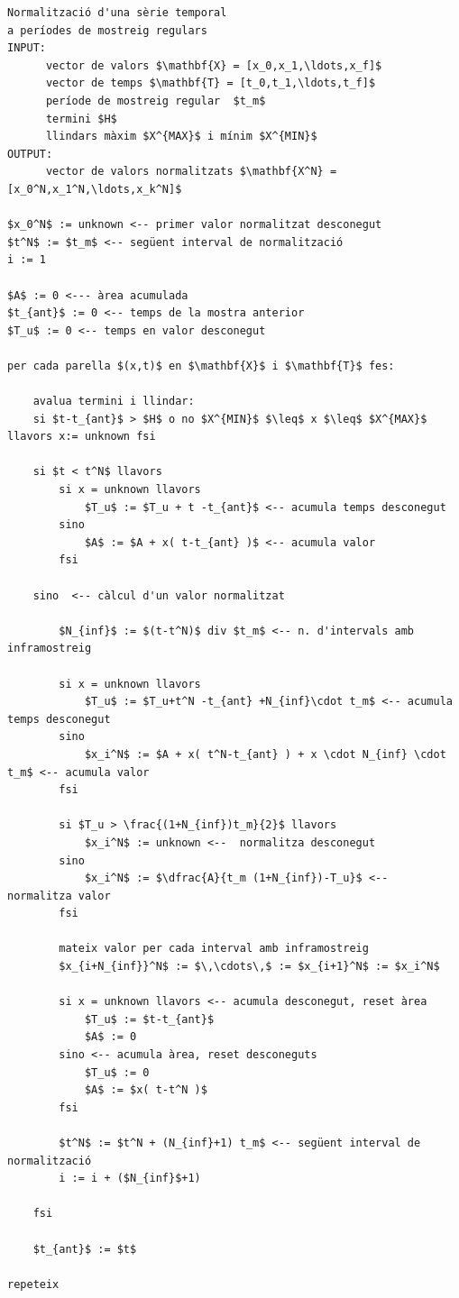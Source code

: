 \begin{lstlisting}[mathescape=true]
Normalització d'una sèrie temporal
a períodes de mostreig regulars 
INPUT: 
      vector de valors $\mathbf{X} = [x_0,x_1,\ldots,x_f]$ 
      vector de temps $\mathbf{T} = [t_0,t_1,\ldots,t_f]$
      període de mostreig regular  $t_m$
      termini $H$
      llindars màxim $X^{MAX}$ i mínim $X^{MIN}$
OUTPUT: 
      vector de valors normalitzats $\mathbf{X^N} = [x_0^N,x_1^N,\ldots,x_k^N]$

$x_0^N$ := unknown <-- primer valor normalitzat desconegut
$t^N$ := $t_m$ <-- següent interval de normalització
i := 1

$A$ := 0 <--- àrea acumulada
$t_{ant}$ := 0 <-- temps de la mostra anterior
$T_u$ := 0 <-- temps en valor desconegut

per cada parella $(x,t)$ en $\mathbf{X}$ i $\mathbf{T}$ fes:

    avalua termini i llindar:
    si $t-t_{ant}$ > $H$ o no $X^{MIN}$ $\leq$ x $\leq$ $X^{MAX}$ llavors x:= unknown fsi

    si $t < t^N$ llavors
        si x = unknown llavors
            $T_u$ := $T_u + t -t_{ant}$ <-- acumula temps desconegut
        sino
            $A$ := $A + x( t-t_{ant} )$ <-- acumula valor
        fsi

    sino  <-- càlcul d'un valor normalitzat

        $N_{inf}$ := $(t-t^N)$ div $t_m$ <-- n. d'intervals amb inframostreig

        si x = unknown llavors
            $T_u$ := $T_u+t^N -t_{ant} +N_{inf}\cdot t_m$ <-- acumula temps desconegut
        sino
            $x_i^N$ := $A + x( t^N-t_{ant} ) + x \cdot N_{inf} \cdot t_m$ <-- acumula valor
        fsi

        si $T_u > \frac{(1+N_{inf})t_m}{2}$ llavors
            $x_i^N$ := unknown <--  normalitza desconegut
        sino
            $x_i^N$ := $\dfrac{A}{t_m (1+N_{inf})-T_u}$ <--  normalitza valor
        fsi

        mateix valor per cada interval amb inframostreig
        $x_{i+N_{inf}}^N$ := $\,\cdots\,$ := $x_{i+1}^N$ := $x_i^N$
                
        si x = unknown llavors <-- acumula desconegut, reset àrea 
            $T_u$ := $t-t_{ant}$
            $A$ := 0
        sino <-- acumula àrea, reset desconeguts
            $T_u$ := 0
            $A$ := $x( t-t^N )$
        fsi

        $t^N$ := $t^N + (N_{inf}+1) t_m$ <-- següent interval de normalització
        i := i + ($N_{inf}$+1)

    fsi 

    $t_{ant}$ := $t$

repeteix
\end{lstlisting}




